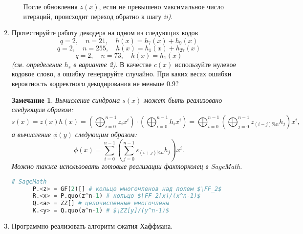 \documentclass[12pt,letterpaper]{article}
\newcommand{\ZZ}{\mathds{Z}}
\newcommand{\FF}{\mathds{F}}
\newtheorem*{remark}{Замечание}
\begin{document}
\begin{enumerate}[\bfseries 1.]
\begin{enumerate}[\it i)]
    После обновления $z(x)$, если не превышено максимальное число итераций, происходит переход обратно к шагу \textit{ii)}.
  \end{enumerate}
  \item Протестируйте работу декодера на одном из следующих кодов
  \[ q=2, \quad n = 21, \quad h(x) = h_7(x) + h_9(x)  \]
  \[ q=2, \quad n = 255, \quad h(x) = h_1(x) + h_{27}(x)  \]
  \[ q=2, \quad n = 73, \quad h(x) = h_1(x)  \]
  \emph{(см. определение $h_s$ в варианте 2)}. В качестве $c(x)$ используйте нулевое кодовое слово, а ошибку генерируйте случайно. При каких весах ошибки вероятность корректного декодирования не меньше $0.9$? 
  \begin{remark}
    Вычисление синдрома $s(x)$ может быть реализовано следующим образом:
    \[ s(x) = z(x) h(x) = \left( \bigoplus_{i=0}^{n-1} z_i x^i \right) \cdot \left( \bigoplus_{i=0}^{n-1} h_i x^i \right) =
      \bigoplus_{i=0}^{n-1} \left( \bigoplus_{j=0}^{n-1} z_{(i - j) \% n} h_j \right) x^i,
    \]
    а вычисление $\phi(y)$ следующим образом:
    \[ \phi(x) =
      \sum_{i=0}^{n-1} \left( \sum_{j=0}^{n-1} s_{(i + j) \% n} h_j \right) x^i.
    \]
    Можно также использовать готовые реализации факторколец в SageMath.
    \begin{lstlisting}[language=Python]
      # SageMath
      P.<z> = GF(2)[] # кольцо многочленов над полем $\FF_2$
      R.<x> = P.quo(z^n-1) # кольцо $\FF_2[x]/(x^n-1)$
      Q.<a> = ZZ[] # целочисленные многочлены
      K.<y> = Q.quo(a^n-1) # $\ZZ[y]/(y^n-1)$
    \end{lstlisting}
  \end{remark}
  \item Программно реализовать алгоритм сжатия Хаффмана.
\end{enumerate}
\end{document}
